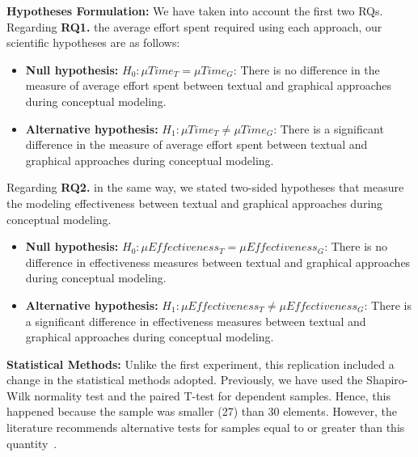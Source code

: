 \textbf{Hypotheses Formulation:} 
We have taken into account the first two RQs. 
Regarding \textbf{RQ1.} the average effort spent required using each approach, our scientific hypotheses are as follows:
\begin{itemize}
    \item \textbf{Null hypothesis:} $H_0 : \mu Time_T = \mu Time_G$: There is no difference in the measure of average effort spent between textual and graphical approaches during conceptual modeling.
    \item \textbf{Alternative hypothesis:} $H_{1} : \mu Time_T \neq \mu Time_G$: There is a significant difference in the measure of average effort spent between textual and graphical approaches during conceptual modeling.
\end{itemize}
Regarding \textbf{RQ2.} 
in the same way, we stated two-sided hypotheses that measure the modeling effectiveness between textual and graphical approaches during conceptual modeling.
\begin{itemize}
    \item \textbf{Null hypothesis:} $H_0 : \mu Effectiveness_T = \mu Effectiveness_G$: There is no difference in effectiveness measures between textual and graphical approaches during conceptual modeling.
    \item \textbf{Alternative hypothesis:} $H_{1} : \mu Effectiveness_T \neq \mu Effectiveness_G$: There is a significant difference in effectiveness measures between textual and graphical approaches during conceptual modeling.
\end{itemize}

\textbf{Statistical Methods:} Unlike the first experiment, this replication included a change in the statistical methods adopted.
Previously, we have used the Shapiro-Wilk normality test and the paired T-test for dependent samples.
Hence, this happened because the sample was smaller (27) than 30 elements.
However, the literature recommends alternative tests for samples equal to or greater than this quantity~\cite{Triola:2018}.

